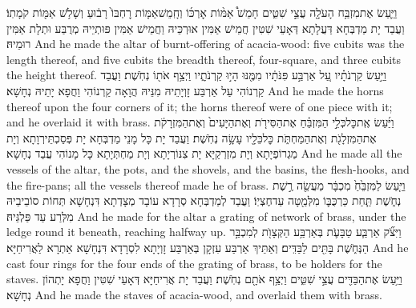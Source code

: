 \newperek
{}%
{וַיַּ֛עַשׂ אֶת\maqqaf מִזְבַּ֥ח הָעֹלָ֖ה עֲצֵ֣י שִׁטִּ֑ים חָמֵשׁ֩ אַמּ֨וֹת אׇרְכּ֜וֹ וְחָֽמֵשׁ\maqqaf אַמּ֤וֹת רׇחְבּוֹ֙ רָב֔וּעַ וְשָׁלֹ֥שׁ אַמּ֖וֹת קֹמָתֽוֹ׃}
{וַעֲבַד יָת מַדְבְּחָא דַּעֲלָתָא דְּאָעֵי שִׁטִּין חֲמֵישׁ אַמִּין אוּרְכֵּיהּ וַחֲמֵישׁ אַמִּין פּוּתְיֵיהּ מְרֻבַּע וּתְלָת אַמִּין רוּמֵיהּ׃}
{And he made the altar of burnt-offering of acacia-wood: five cubits was the length thereof, and five cubits the breadth thereof, four-square, and three cubits the height thereof.}{}
{וַיַּ֣עַשׂ קַרְנֹתָ֗יו עַ֚ל אַרְבַּ֣ע פִּנֹּתָ֔יו מִמֶּ֖נּוּ הָי֣וּ קַרְנֹתָ֑יו וַיְצַ֥ף אֹת֖וֹ נְחֹֽשֶׁת׃}
{וַעֲבַד קַרְנוֹהִי עַל אַרְבַּע זָוְיָתֵיהּ מִנֵּיהּ הֲוָאָה קַרְנוֹהִי וַחֲפָא יָתֵיהּ נְחָשָׁא׃}
{And he made the horns thereof upon the four corners of it; the horns thereof were of one piece with it; and he overlaid it with brass.}{}
{וַיַּ֜עַשׂ אֶֽת\maqqaf כׇּל\maqqaf כְּלֵ֣י הַמִּזְבֵּ֗חַ אֶת\maqqaf הַסִּירֹ֤ת וְאֶת\maqqaf הַיָּעִים֙ וְאֶת\maqqaf הַמִּזְרָקֹ֔ת אֶת\maqqaf הַמִּזְלָגֹ֖ת וְאֶת\maqqaf הַמַּחְתֹּ֑ת כׇּל\maqqaf כֵּלָ֖יו עָשָׂ֥ה נְחֹֽשֶׁת׃}
{וַעֲבַד יָת כָּל מָנֵי מַדְבְּחָא יָת פְּסַכְתֵּירְוָתָא וְיָת מַגְרוֹפְיָתָא וְיָת מִזְרְקַיָּא יָת צִנּוֹרְיָתָא וְיָת מַחְתְּיָתָא כָּל מָנוֹהִי עֲבַד נְחָשָׁא׃}
{And he made all the vessels of the altar, the pots, and the shovels, and the basins, the flesh-hooks, and the fire-pans; all the vessels thereof made he of brass.}{}
{וַיַּ֤עַשׂ לַמִּזְבֵּ֙חַ֙ מִכְבָּ֔ר מַעֲשֵׂ֖ה רֶ֣שֶׁת נְחֹ֑שֶׁת תַּ֧חַת כַּרְכֻּבּ֛וֹ מִלְּמַ֖טָּה עַד\maqqaf חֶצְיֽוֹ׃}
{וַעֲבַד לְמַדְבְּחָא סְרָדָא עוֹבָד מְצָדְתָא דִּנְחָשָׁא תְּחוֹת סוֹבֵיבֵיהּ מִלְּרַע עַד פַּלְגֵּיהּ׃}
{And he made for the altar a grating of network of brass, under the ledge round it beneath, reaching halfway up.}{}
{וַיִּצֹ֞ק אַרְבַּ֧ע טַבָּעֹ֛ת בְּאַרְבַּ֥ע הַקְּצָוֺ֖ת לְמִכְבַּ֣ר הַנְּחֹ֑שֶׁת בָּתִּ֖ים לַבַּדִּֽים׃}
{וְאַתֵּיךְ אַרְבַּע עִזְקָן בְּאַרְבַּע זָוְיָתָא לִסְרָדָא דִּנְחָשָׁא אַתְרָא לַאֲרִיחַיָּא׃}
{And he cast four rings for the four ends of the grating of brass, to be holders for the staves.}{}
{וַיַּ֥עַשׂ אֶת\maqqaf הַבַּדִּ֖ים עֲצֵ֣י שִׁטִּ֑ים וַיְצַ֥ף אֹתָ֖ם נְחֹֽשֶׁת׃}
{וַעֲבַד יָת אֲרִיחַיָּא דְּאָעֵי שִׁטִּין וַחֲפָא יָתְהוֹן נְחָשָׁא׃}
{And he made the staves of acacia-wood, and overlaid them with brass.}{}
